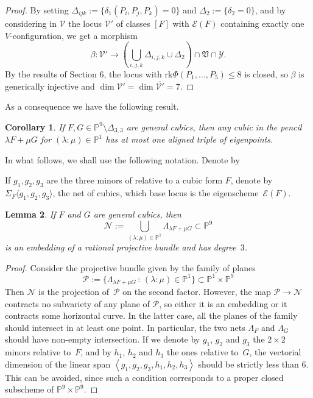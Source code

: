 \documentclass{amsart}
\theoremstyle{plain}
\newtheorem{lemma}{Lemma}[section]
\newtheorem{prop}[lemma]{Proposition}
\newtheorem{corollary}[lemma]{Corollary}
\theoremstyle{definition}
\newtheorem{definition}[lemma]{Definition}
\newcommand{\p}{\mathbb{P}}
\newcommand{\sV}{\mathcal{V}}
\newcommand{\sY}{\mathcal{Y}}
\newcommand{\Eig}[1]{\mathcal{E}\!\left( {#1} \right)}
\newcommand{\rk}{\ensuremath{\mathrm{rk}}}
\begin{document}
{\begin{proof}
By setting $\Delta_{ijk} :=\{\delta_1 (P_i, P_j,P_k)=0\}$
and $\Delta_2:=\{\delta_2=0\}$, and by considering in $\sV$ the locus
$\mathcal{V}'$ of classes $[F]$ with $\Eig{F}$ containing exactly one $V$-configuration,
we get a morphism
$$
\beta : \mathcal{V}' \to (\bigcup_{i,j,k}\Delta_{i,j,k} \cup \Delta_2) \cap \mathfrak{V} \cap \sY.
$$
By the results of Section 6, the locus with $\rk \Phi(P_1, \dots,P_5)\le 8$ is closed, so $\beta$ is generically injective and $\dim \mathcal{V}'=\dim \overline {\mathcal{V}'}=7$.
%
\end{proof}
 As a consequence we have the following result.
\begin{corollary}
\label{lemma:pencil_one_aligned}
 If $F,G \in \p^9 \setminus \Delta_{3,3}$ are general cubics, then any cubic in the pencil $\lambda F + \mu G$ for $(\lambda: \mu) \in \p^1$ has at most one aligned triple of eigenpoints.
\end{corollary}





%

In what follows, we shall use the following notation.
Denote by


If $g_1, g_2, g_3$ are the three minors of  relative
to a cubic form $F$, denote by $\Sigma_F \langle g_1, g_2, g_3 \rangle$,
the net of cubics, which base locus is the eigenscheme~$\Eig{F}$.
%
\begin{lemma}
\label{lemma:scroll}
 If $F$ and $G$ are general cubics, then
 \[
   \mathcal{N} := \bigcup_{(\lambda : \mu) \in \p^1} \Lambda_{\lambda F + \mu G} \subset \p^9
 \]
 is an embedding of a rational projective bundle and has degree~$3$.
\end{lemma}
\begin{proof}
Consider the projective bundle given by the family of planes
%
\[
{\mathcal P} := \{ \Lambda_{\lambda F + \mu G} \, : \, (\lambda: \mu)\in \p^1 \} \subset \p^1 \times \p^9
\]
%
Then $\mathcal{N}$ is the projection of~$\mathcal{P}$ on the second factor.
However, the map ${\mathcal P} \to {\mathcal N}$ contracts no subvariety of any plane of ${\mathcal P}$, so either it is an embedding or it contracts some horizontal curve. In the latter case, all the planes of the family should intersect in at least one point. In particular, the two nets $\Lambda_F$ and $\Lambda_G$ should have non-empty intersection.
If we denote by $g_1$, $g_2$ and $g_3$ the $2 \times 2$ minors relative to~$F$, and by $h_1$, $h_2$ and $h_3$ the ones relative to~$G$, the vectorial dimension of the linear span $\left\langle g_1, g_2, g_3, h_1, h_2, h_3 \right\rangle$ should be strictly less than $6$. This can be avoided, since such a condition corresponds to a proper closed subscheme of $\p^9 \times \p^9$.


\end{proof}}
\end{document}
